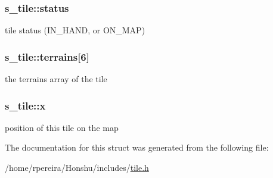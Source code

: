 \subsubsection[{\texorpdfstring{status}{status}}]{ s\+\_\+tile\+::status}\hypertarget{structs__tile_affc8310793704fcefa825095bfdc1f7f}{}\label{structs__tile_affc8310793704fcefa825095bfdc1f7f}
tile status (I\+N\+\_\+\+H\+A\+ND, or O\+N\+\_\+\+M\+AP) 
\subsubsection[{\texorpdfstring{terrains}{terrains}}]{ s\+\_\+tile\+::terrains\mbox{[}6\mbox{]}}\hypertarget{structs__tile_a31ded1ea12a7b15ca42dcc9a5f41eb6b}{}\label{structs__tile_a31ded1ea12a7b15ca42dcc9a5f41eb6b}
the terrain\textquotesingle{}s array of the tile 
\subsubsection[{\texorpdfstring{x}{x}}]{ s\+\_\+tile\+::x}\hypertarget{structs__tile_aa515ee382fc80e5ae75c855d86e0ec3c}{}\label{structs__tile_aa515ee382fc80e5ae75c855d86e0ec3c}
position of this tile on the map 

The documentation for this struct was generated from the following file\+:\begin{DoxyCompactItemize}
\item 
/home/rpereira/\+Honshu/includes/\hyperlink{tile_8h}{tile.\+h}\end{DoxyCompactItemize}
